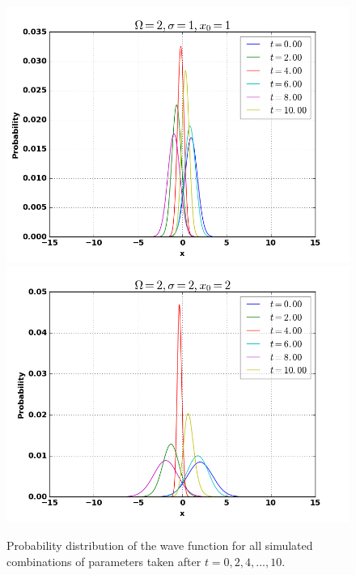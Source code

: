 \documentclass[12pt,a4paper]{article}
\begin{document}
\begin{figure}
\includegraphics[scale=0.4]{Bilder/211.png}
\includegraphics[scale=0.4]{Bilder/222.png}
\caption{Probability distribution of the wave function for all simulated combinations of parameters taken after $t = 0,2,4,...,10$.}
\label{fig:prob}
\end{figure}
\end{document}
